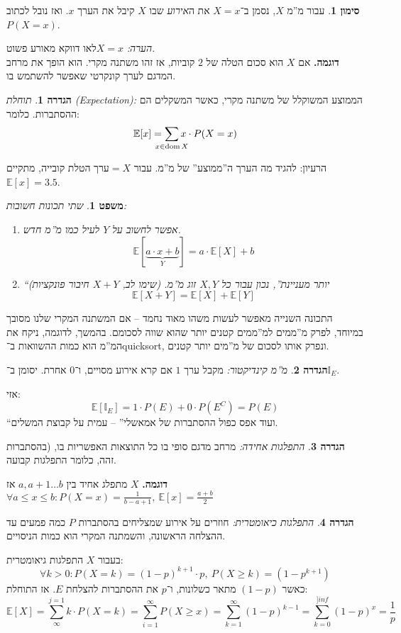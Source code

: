 \documentclass[]{article}
\newcommand\E     {\mathbb{E}}
\newcommand\One   {\mathbb{I}}
\DeclareMathOperator\dom   {dom}
\renewcommand\inf {\infty}
\newcommand\co        {\colon}
\newtheorem{Theorem}{משפט}
\theoremstyle{definition}
\newtheorem{definition}{הגדרה}
\newtheorem{Notion}{סימון}
\newcommand\theo  [1] {\begin{Theorem}#1\end{Theorem}}
\newcommand\defi  [1] {\begin{definition}#1\end{definition}}
\newcommand\noti  [1] {\begin{Notion}#1\end{Notion}}
\begin{document}
    \noti{עבור מ''מ $X$, נסמן ב־$X = x$ את ה\textit{אירוע} שבו $X$ קיבל את הערך $x$. ואז נובל לכתוב $P(X = x)$. }
    \textit{הערה: }$X = x$לאו דווקא מאורע פשוט. \\
    \textbf{דוגמה. }אם $X$ הוא סכום הטלה של $2$ קוביות, אז זהו משתנה מקרי. הוא הופך את מרחב המדגם לערך קונקרטי שאפשר להשתמש בו. 
    
    \defi{\textit{תוחלת (Expectation): }הממוצע המשוקלל של משתנה מקרי, כאשר המשקלים הם ההסתברות. כלומר: 
    \[ \E[x] = \sum_{\mathclap{x \in \dom X}} x \cdot P(X = x) \]}
    הרעיון: להגיד מה הערך ה''ממוצע'' של מ''מ. עבור $=X$ערך הטלת קובייה, מתקיים $\E[x] = 3.5$. 
    
    \theo{שתי תכונות חשובות: 
    \begin{enumerate}
        \item אפשר לחשוב על $Y$ לעיל כמו מ''מ חדש. 
        \[ \E[\underbrace{a \cdot x + b}_{Y}] = a \cdot \E[X] + b \]
        \item ``יותר מעניינת'', נכון עבור כל $X, Y$ זוג מ''מ. (שימו לב, $X + Y$ חיבור פונקציות)
        \[ \E[X + Y] = \E[X] + \E[Y] \]
    \end{enumerate}}
    התכונה השנייה מאפשר לעשות משהו מאוד נחמד – אם המשתנה המקרי שלנו מסובך במיוחד, לפרק מ''ממים למ''ממים קטנים יותר שהוא שווה לסכומם. בהמשך, לדוגמה, ניקח את המ''מ הוא כמות ההשוואות ב־quicksort, ונפרק אותו לסכום של מ''מים יותר קטנים. 
    
    \defi{\textit{מ''מ קינדיקטור: }מקבל ערך $1$ אם קרא אירוע מסויים, ו־$0$ אחרת. יסומן ב־$\mathbb{I}_E$. }
    אזי: 
    \[ \E[\One_E] = 1 \cdot P(E) + 0 \cdot P(E^{C}) = P(E) \]
    ``ועוד אפס כפול ההסתברות של אמאשלי'' – עמית על קבוצת המשלים. 
    
    \defi{\textit{התפלגות אחידה: }מרחב מדגם סופי בו כל התוצאות האפשריות בו, (בהסתברות זהה, כלומר התפלגות קבועה. }
    \textbf{דוגמה. }$X$ מתפלג אחיד בין $a, a + 1 \dots b$ אז $\forall a \le x \le b \co P(X = x) = \frac{1}{b - a + 1}, \ \E[x] = \frac{a + b}{2}$
    \defi{\textit{התפלגות כיאומטרית: }חוזרים על אירוע שמצליחים בהסתברות $P$ כמה פמעים עד ההצלחה הראשונה, והשמתנה המקרי הוא כמות הניסויים. }בעבור $X$ התפלגות גיאומטרית: 
    \[ \forall k > 0 \co P(X = k) = (1 - p)^{k + 1} \cdot p, \ P(X \ge k) = (1 - p^{k + 1}) \]
    כאשר $(1 - p)$ מתאר כשלונות, ו־$p$ את ההסתברות להצלחת $E$. אז התוחלת: 
    \[ \E[X] = \sum_{\inf}^{j = 1}k \cdot P(X = k) = \sum_{i = 1}^{\inf}P(X \ge x) = \sum_{k = 1}^{\inf}(1 - p)^{k - 1} = \sum_{k = 0}^{]inf}(1 - p)^{x} = \frac{1}{p} \]
    
    
\end{document}
